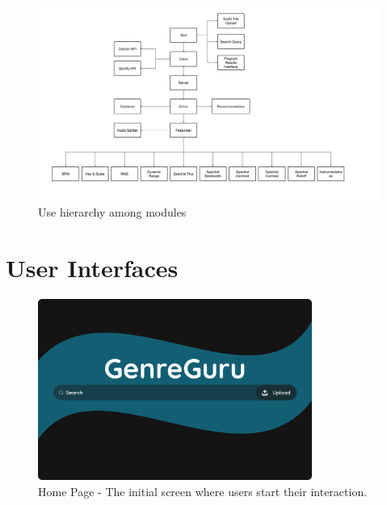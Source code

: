 \documentclass[12pt, titlepage]{article}
\begin{document}

\begin{figure}[H]
\centering
\includegraphics[width=1.0\textwidth]{UsesHierarchy.png}
\caption{Use hierarchy among modules}
\label{FigUH}
\end{figure}


\section{User Interfaces}


\begin{figure}[h!]
    \centering
    \includegraphics[width=0.8\textwidth]{UI_Images/Home_Page.png}
    \caption{Home Page - The initial screen where users start their interaction.}
    \label{fig:home_page}
\end{figure}
\end{document}
